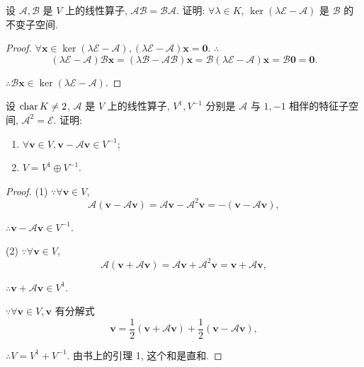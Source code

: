 \documentclass[color=black,device=normal,lang=cn,mode=geye]{elegantnote}
\begin{document}
\begin{exercisec}[2.3.3]
    设 $\mathcal{A},\mathcal{B}$ 是 $V$ 上的线性算子, $\mathcal{AB}=\mathcal{BA}$. 证明: $\forall\lambda\in K$, $\ker(\lambda\mathcal{E}-\mathcal{A})$ 是 $\mathcal{B}$ 的不变子空间.
\end{exercisec}
\begin{proof}
    $\forall\boldsymbol{x}\in\ker(\lambda\mathcal{E}-\mathcal{A}),(\lambda\mathcal{E}-\mathcal{A})\boldsymbol{x}=\boldsymbol{0}$. $\therefore$
    \[(\lambda\mathcal{E}-\mathcal{A})\mathcal{B}\boldsymbol{x}=(\lambda\mathcal{B}-\mathcal{AB})\boldsymbol{x}=\mathcal{B}(\lambda\mathcal{E}-\mathcal{A})\boldsymbol{x}=\mathcal{B}\boldsymbol{0}=\boldsymbol{0}.\]

    $\therefore\mathcal{B}\boldsymbol{x}\in\ker(\lambda\mathcal{E}-\mathcal{A})$.
\end{proof}
\begin{exercisec}[2.3.5]\label{exc2.3.5}
    设 $\operatorname{char} K\neq 2$, $\mathcal{A}$ 是 $V$ 上的线性算子, $V^1,V^{-1}$ 分别是 $\mathcal{A}$ 与 $1,-1$ 相伴的特征子空间, $\mathcal{A}^2=\mathcal{E}$. 证明:
    \begin{enumerate}
        \def\labelenumi{(\arabic{enumi})}
        \item $\forall\boldsymbol{v}\in V,\boldsymbol{v}-\mathcal{A}\boldsymbol{v}\in V^{-1}$;
        \item $V=V^1\oplus V^{-1}$.
    \end{enumerate}
\end{exercisec}
\begin{proof}
    (1) $\because\forall\boldsymbol{v}\in V$,
    \[\mathcal{A}(\boldsymbol{v}-\mathcal{A}\boldsymbol{v})=\mathcal{A}\boldsymbol{v}-\mathcal{A}^2\boldsymbol{v}=-(\boldsymbol{v}-\mathcal{A}\boldsymbol{v}),\]

    $\therefore\boldsymbol{v}-\mathcal{A}\boldsymbol{v}\in V^{-1}$.

    (2) $\because\forall\boldsymbol{v}\in V$,
    \[\mathcal{A}(\boldsymbol{v}+\mathcal{A}\boldsymbol{v})=\mathcal{A}\boldsymbol{v}+\mathcal{A}^2\boldsymbol{v}=\boldsymbol{v}+\mathcal{A}\boldsymbol{v},\]

    $\therefore\boldsymbol{v}+\mathcal{A}\boldsymbol{v}\in V^1$.

    $\because\forall\boldsymbol{v}\in V,\boldsymbol{v}$ 有分解式
    \[\boldsymbol{v}=\dfrac{1}{2}(\boldsymbol{v}+\mathcal{A}\boldsymbol{v})+\dfrac{1}{2}(\boldsymbol{v}-\mathcal{A}\boldsymbol{v}),\]

    $\therefore V=V^1+V^{-1}$. 由书上的引理 1, 这个和是直和.
\end{proof}
\end{document}
